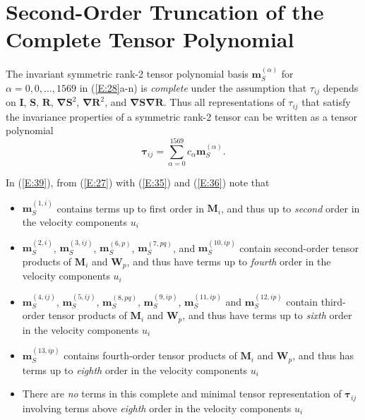 \section{Second-Order Truncation of the Complete Tensor Polynomial}
\label{sec:3}

The invariant symmetric rank-2 tensor polynomial basis  $\mathbf{m}^{(\alpha)}_S$  for  $\alpha = 0,0,\ldots,1569$ in (\ref{E:28}a-n) is \textit{complete} under the assumption that  $\tau_{ij}$ depends on $\mathbf{I}$, $\mathbf{S}$, $\mathbf{R}$, $\mathbf{\nabla S}^{2}$, $\mathbf{\nabla R}^{2}$, and $\mathbf{\nabla S \nabla R}$.  Thus all representations of $\tau_{ij}$ that satisfy the invariance properties of a symmetric rank-2 tensor can be written as a tensor polynomial
%
\begin{equation}
\label{E:40}
	\mathbf{\tau}_{ij} = \sum_{\alpha=0}^{1569} c_{\alpha} \mathbf{m}^{(\alpha)}_{S}.
\end{equation}
%
% 

In (\ref{E:39}), from (\ref{E:27}) with (\ref{E:35}) and (\ref{E:36}) note that
%
\begin{itemize}
%
	\item	$\mathbf{m}^{(1,i)}_{S}$ contains terms up to first order in $\mathbf{M}_{i}$, and thus up to \textit{second} order in the velocity components $u_i$ 
%	
	\item	$\mathbf{m}^{(2,i)}_{S}$, $\mathbf{m}^{(3,ij)}_{S}$, $\mathbf{m}^{(6,p)}_{S}$, $\mathbf{m}^{(7,pq)}_{S}$, and $\mathbf{m}^{(10,ip)}_{S}$  contain second-order tensor products of  $\mathbf{M}_{i}$  and $\mathbf{W}_{p}$, and thus have terms up to \textit{fourth} order in the velocity components  $u_i$ 
%	
	\item	 $\mathbf{m}^{(4,ij)}_{S}$, $\mathbf{m}^{(5,ij)}_{S}$, $\mathbf{m}^{(8,pq)}_{S}$, $\mathbf{m}^{(9,ip)}_{S}$, $\mathbf{m}^{(11,ip)}_{S}$ and $\mathbf{m}^{(12,ip)}_{S}$ contain third-order tensor products of $\mathbf{M}_{i}$  and $\mathbf{W}_{p}$, and thus have terms up to \textit{sixth} order in the velocity components $u_i$ 
%	
	\item	 $\mathbf{m}^{(13,ip)}_{S}$  contains fourth-order tensor products of $\mathbf{M}_{i}$  and $\mathbf{W}_{p}$, and thus has terms up to \textit{eighth} order in the velocity components $u_i$
%	
	\item	There are \textit{no} terms in this complete and minimal tensor representation of $\mathbf{\tau}_{ij}$  involving terms above \textit{eighth} order in the velocity components $u_i$
%
\end{itemize}
%
%   


